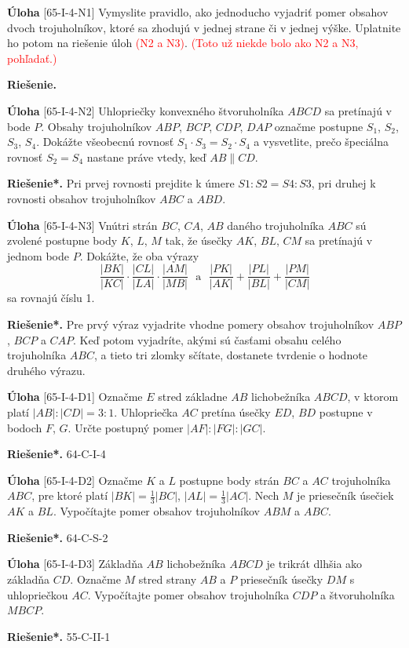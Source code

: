 \documentclass{article}
\newcommand{\rie}{\textbf{Riešenie.} }
\newcommand{\rieh}{\textbf{Riešenie*.} }
\newcommand\todo[1]{\noindent\textcolor{red}{(#1)}}
\newcommand{\problem}[3]{
  \begin{tcolorbox}[breakable,notitle,boxrule=0pt,colback=light-gray,colframe=light-gray]
    \textbf{Úloha}
    [#1] #2
  \end{tcolorbox}
  \noindent#3
}
\begin{document}
\problem{65-I-4-N1}{
Vymyslite pravidlo, ako jednoducho vyjadriť pomer obsahov dvoch trojuholníkov, ktoré sa zhodujú v jednej strane či v jednej výške. Uplatnite ho potom na riešenie úloh \todo{N2 a N3}. \todo{Toto už niekde bolo ako N2 a N3, pohľadať.}
}{
\rie 
}


\problem{65-I-4-N2}{
Uhlopriečky konvexného štvoruholníka $ABCD$ sa pretínajú v bode $P$. Obsahy trojuholníkov $ABP$, $BCP$, $CDP$, $DAP$ označme postupne $S_1$, $S_2$, $S_3$, $S_4$. Dokážte všeobecnú
rovnosť $S_1 \cdot S_3 = S_2 \cdot S_4$ a vysvetlite, prečo špeciálna rovnosť $S_2 = S_4$ nastane práve vtedy, keď $AB \parallel CD$.
}{
\rieh Pri prvej rovnosti prejdite k úmere $S1 : S2 = S4 : S3$, pri druhej k rovnosti obsahov trojuholníkov $ABC$ a $ABD$.
}


\problem{65-I-4-N3}{
Vnútri strán $BC$, $CA$, $AB$ daného trojuholníka $ABC$ sú zvolené postupne body $K$, $L$, $M$ tak, že úsečky $AK$, $BL$, $CM$ sa pretínajú v jednom bode $P$. Dokážte, že oba výrazy
$$\frac{|BK|}{|KC|}\cdot \frac{|CL|}{|LA|}\cdot \frac{|AM|}{|MB|} \ \ \ \text{a} \ \ \ \frac{|P K|}{|AK|}+\frac{|P L|}{|BL|}+\frac{|P M|}{|CM|}$$
sa rovnajú číslu 1. 
}{
\rieh Pre prvý výraz vyjadrite vhodne pomery obsahov trojuholníkov $ABP$, $BCP$ a $CAP$. Keď potom vyjadríte, akými sú časťami obsahu celého trojuholníka $ABC$, a tieto tri zlomky sčítate, dostanete tvrdenie o hodnote druhého výrazu.
}


\problem{65-I-4-D1}{
Označme $E$ stred základne $AB$ lichobežníka $ABCD$, v ktorom platí $|AB| : |CD| = 3 : 1$. Uhlopriečka $AC$ pretína úsečky $ED$, $BD$ postupne v bodoch $F$, $G$. Určte postupný pomer $|AF | : |F G| : |GC|$.
}{
\rieh 64-C-I-4
}


\problem{65-I-4-D2}{
Označme $K$ a $L$ postupne body strán $BC$ a $AC$ trojuholníka $ABC$, pre ktoré platí $|BK| =\frac{1}{3}|BC|$, $|AL| =\frac{1}{3}|AC|$. Nech $M$ je priesečník úsečiek $AK$ a $BL$. Vypočítajte pomer obsahov trojuholníkov $ABM$ a $ABC$.
}{
\rieh 64-C-S-2
}


\problem{65-I-4-D3}{
Základňa $AB$ lichobežníka $ABCD$ je trikrát dlhšia ako základňa $CD$. Označme $M$ stred strany $AB$ a $P$ priesečník úsečky $DM$ s uhlopriečkou $AC$. Vypočítajte pomer obsahov trojuholníka $CDP$ a štvoruholníka $MBCP$.
}{
\rieh 55-C-II-1
}
\end{document}
